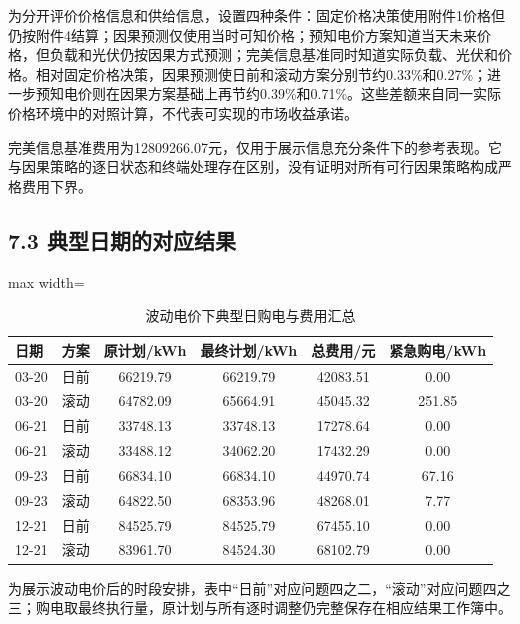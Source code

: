 \documentclass[UTF8,a4paper,zihao=-4,fontset=windows]{ctexart}
\begin{document}
为分开评价价格信息和供给信息，设置四种条件：固定价格决策使用附件1价格但仍按附件4结算；因果预测仅使用当时可知价格；预知电价方案知道当天未来价格，但负载和光伏仍按因果方式预测；完美信息基准同时知道实际负载、光伏和价格。相对固定价格决策，因果预测使日前和滚动方案分别节约0.33\%和0.27\%；进一步预知电价则在因果方案基础上再节约0.39\%和0.71\%。这些差额来自同一实际价格环境中的对照计算，不代表可实现的市场收益承诺。
\par
完美信息基准费用为12809266.07元，仅用于展示信息充分条件下的参考表现。它与因果策略的逐日状态和终端处理存在区别，没有证明对所有可行因果策略构成严格费用下界。
\par
\subsection{7.3 典型日期的对应结果}
\begin{table}[H]\centering\caption{波动电价下典型日购电与费用汇总}
\fontsize{9.5}{12}\selectfont\setlength{\tabcolsep}{4pt}\renewcommand{\arraystretch}{1.12}
\begin{adjustbox}{max width=\linewidth}\begin{tabular}{lccccc}\toprule
日期 & 方案 & 原计划/kWh & 最终计划/kWh & 总费用/元 & 紧急购电/kWh\\\midrule
03-20 & 日前 & 66219.79 & 66219.79 & 42083.51 & 0.00\\
03-20 & 滚动 & 64782.09 & 65664.91 & 45045.32 & 251.85\\
06-21 & 日前 & 33748.13 & 33748.13 & 17278.64 & 0.00\\
06-21 & 滚动 & 33488.12 & 34062.20 & 17432.29 & 0.00\\
09-23 & 日前 & 66834.10 & 66834.10 & 44970.74 & 67.16\\
09-23 & 滚动 & 64822.50 & 68353.96 & 48268.01 & 7.77\\
12-21 & 日前 & 84525.79 & 84525.79 & 67455.10 & 0.00\\
12-21 & 滚动 & 83961.70 & 84524.30 & 68102.79 & 0.00\\
\bottomrule\end{tabular}\end{adjustbox}\end{table}
为展示波动电价后的时段安排，表中“日前”对应问题四之二，“滚动”对应问题四之三；购电取最终执行量，原计划与所有逐时调整仍完整保存在相应结果工作簿中。
\par
\end{document}
